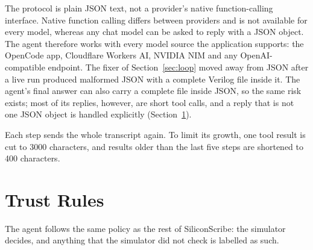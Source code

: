 The protocol is plain JSON text, not a provider's native function-calling interface.
Native function calling differs between providers and is not available for every
model, whereas any chat model can be asked to reply with a JSON object. The agent therefore
works with every model source the application supports: the OpenCode app,
Cloudflare Workers AI, NVIDIA NIM and any OpenAI-compatible endpoint. The fixer of
Section~\ref{sec:loop} moved away from JSON after a live run produced malformed JSON
with a complete Verilog file inside it. The agent's final answer can also carry a
complete file inside JSON, so the same risk exists; most of its replies, however, are
short tool calls, and a reply that is not one JSON object is handled explicitly
(Section~\ref{sec:agenttrust}).

Each step sends the whole transcript again. To limit its growth, one tool result is
cut to 3000 characters, and results older than the last five steps are shortened to
400 characters.

\section{Trust Rules}
\label{sec:agenttrust}
The agent follows the same policy as the rest of SiliconScribe: the simulator
decides, and anything that the simulator did not check is labelled as such.

